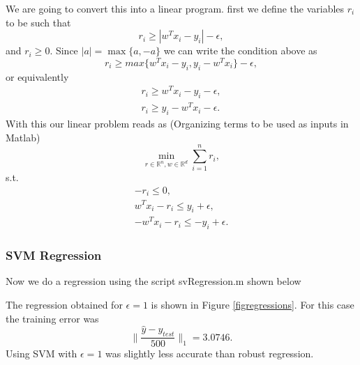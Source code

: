 \documentclass[11pt]{article}
\theoremstyle{plain}
\begin{document}
We are going to convert this into a linear program. first we define the variables $r_{i}$ to be such that
\begin{equation*}
r_{i}\geq |w^{T}x_{i}-y_{i}|-\epsilon,
\end{equation*}
and $r_{i}\geq 0$. Since $|a|=\max\{a,-a\}$ we can write the condition above as
\begin{equation*}
r_{i}\geq max\{w^{T}x_{i}-y_{i},y_{i}-w^{T}x_{i}\}-\epsilon,
\end{equation*}
or equivalently
\begin{eqnarray*}
r_{i}\geq w^{T}x_{i}-y_{i}-\epsilon,\\
r_{i}\geq y_{i}-w^{T}x_{i}-\epsilon.
\end{eqnarray*}
With this our linear problem reads as (Organizing terms to be used as inputs in Matlab)
\begin{equation*}
\min_{r\in\mathbb{R}^{n},w\in\mathbb{R}^{d}}\sum_{i=1}^{n} r_{i},
\end{equation*}
s.t.
\begin{eqnarray*}
-r_{i}\leq 0,\\
w^{T}x_{i}-r_{i}\leq y_{i}+\epsilon, \\
-w^{T}x_{i}-r_{i}\leq -y_{i}+\epsilon.
\end{eqnarray*}


\subsubsection{SVM Regression}
Now we do a regression using the script svRegression.m shown below



The regression obtained for $\epsilon=1$ is shown in Figure \ref{figregressions}. For this case 
the training error was
\begin{equation*}
\|\frac{\hat{y}-y_{test}}{500}\|_{1}=3.0746.
\end{equation*}
Using SVM with $\epsilon=1$ was slightly less accurate than robust regression.
\end{document}
